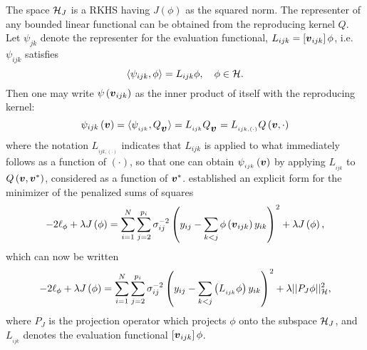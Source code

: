 \noindent
The space $\mathcal{H}_J$ is a RKHS having $J\left(\phi\right)$ as the squared norm. The representer of any bounded linear functional can be obtained from the reproducing kernel $Q$. Let $\psi_{jk}$ denote the representer for the evaluation functional, $L_{ijk} = \left[\mbox{\boldmath $v$}_{ijk}\right]\phi$, i.e. $\psi_{ijk}$ satisfies
\[
\langle \psi_{ijk}, \phi \rangle = L_{ijk}\phi, \quad \phi \in \mathcal{H}.
\]
\noindent
Then one may write $\psi\left( \mbox{\boldmath $v$}_{ijk} \right)$ as the inner product of itself with the reproducing kernel:
\begin{equation} \label{eq:representer-as-inner-product}
\psi_{ijk}\left( \mbox{\boldmath $v$} \right) = \langle \psi_{_{ijk}}, Q_{_{\mbox{\boldmath $v$}}} \rangle = L_{_{ijk}} Q_{_{\mbox{\boldmath $v$}}} = L_{_{ijk,\left(\cdot\right)}} Q \left(\mbox{\boldmath $v$},\cdot\right)
\end{equation}
 \noindent
 where the notation $L_{_{ijk,\left(\cdot\right)}}$ indicates that $L_{ijk}$ is applied to what immediately follows as a function of $\left( \cdot \right)$, so that one can obtain $\psi_{_{ijk}}\left(\mbox{\boldmath $v$}\right)$ by applying $L_{_{ijk}}$ to $Q\left(\mbox{\boldmath $v$}, \mbox{\boldmath $v$}^*\right)$, considered as a function of $\mbox{\boldmath $v$}^*$. \cite{wahba1990spline} established an explicit form for the minimizer of the penalized sums of squares
 \begin{equation} \label{eq:phi-penalized-sums-of-squares}
 -2\ell_\phi + \lambda J\left(\phi\right) = \sum_{i=1}^N \sum_{j=2}^{p_i} \sigma^{-2}_{ij}\left( y_{ij} - \sum_{k<j} \phi\left(\mbox{\boldmath $v$}_{ijk}\right) y_{ik}  \right)^2 + \lambda J\left( \phi \right),
 \end{equation}
\noindent
 which can now be written
 \begin{equation} \label{eq:phi-penalized-sums-of-squares-RK-norm}
-2\ell_\phi + \lambda J\left(\phi\right) = \sum_{i=1}^N \sum_{j=2}^{p_i} \sigma^{-2}_{ij}\left( y_{ij} - \sum_{k<j}\left( L_{_{ijk}}\phi\right) y_{ik}  \right)^2 + \lambda \vert\vert P_J \phi \vert \vert_{\mathcal{H}}^2, 
\end{equation} 
\noindent
where $P_J$ is the projection operator which projects $\phi$ onto the subspace $\mathcal{H}_J$, and $L_{_{ijk}}$ denotes the evaluation functional $\left[\mbox{\boldmath $v$}_{ijk}\right] \phi$. 
 

